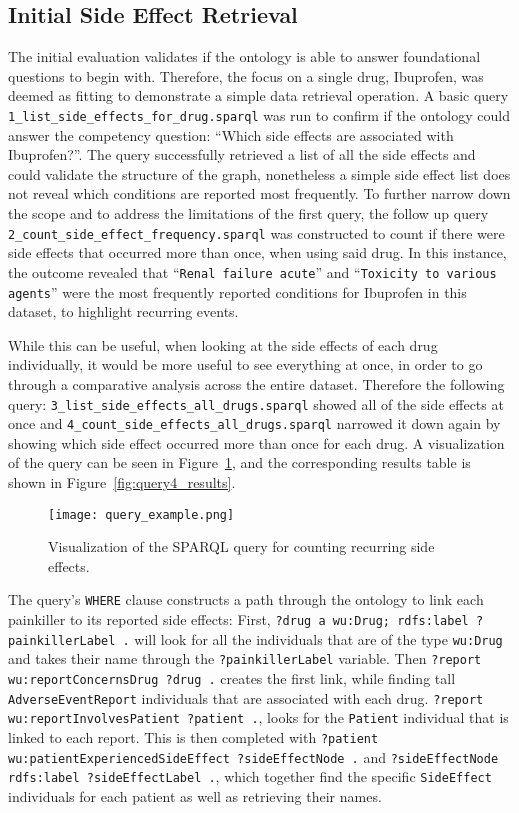 \subsection{Initial Side Effect Retrieval}
The initial evaluation validates if the ontology is able to answer foundational questions to begin with. Therefore, the focus on a single drug, Ibuprofen, was deemed as fitting to demonstrate a simple data retrieval operation.
A basic query \nolinkurl{1_list_side_effects_for_drug.sparql} was run to confirm if the ontology could answer the competency question: “Which side effects are associated with Ibuprofen?”. The query successfully retrieved a list of all the side effects and could validate the structure of the graph, nonetheless a simple side effect list does not reveal which conditions are reported most frequently. To further narrow down the scope and to address the limitations of the first query, the follow up query \nolinkurl{2_count_side_effect_frequency.sparql} was constructed to count if there were side effects that occurred more than once, when using said drug. In this instance, the outcome revealed that ``\texttt{Renal failure acute}'' and ``\texttt{Toxicity to various agents}'' were the most frequently reported conditions for Ibuprofen in this dataset, to highlight recurring events.

While this can be useful, when looking at the side effects of each drug individually, it would be more useful to see everything at once, in order to go through a comparative analysis across the entire dataset. Therefore the following query: \nolinkurl{3_list_side_effects_all_drugs.sparql} showed all of the side effects at once and \nolinkurl{4_count_side_effects_all_drugs.sparql} narrowed it down again by showing which side effect occurred more than once for each drug. A visualization of the query can be seen in Figure~\ref{fig:query4_visualization}, and the corresponding results table is shown in Figure~\ref{fig:query4_results}.

\begin{figure}[H]
\centering
\texttt{[image: query\_example.png]} %
\caption{Visualization of the SPARQL query for counting recurring side effects.}
\label{fig:query4_visualization}
\end{figure}


The query’s \texttt{WHERE} clause constructs a path through the ontology to link each painkiller to its reported side effects:
First, \nolinkurl{?drug a wu:Drug; rdfs:label ?painkillerLabel .} will look for all the individuals that are of the type \texttt{wu:Drug} and takes their name through the \texttt{?painkillerLabel} variable.
Then \nolinkurl{?report wu:reportConcernsDrug ?drug .} creates the first link, while finding tall \texttt{Adverse\-Event\-Report} individuals that are associated with each drug. \nolinkurl{?report wu:reportInvolvesPatient ?patient .}, looks for the \texttt{Patient} individual that is linked to each report. This is then completed with \nolinkurl{?patient wu:patientExperiencedSideEffect ?sideEffectNode .} and \nolinkurl{?sideEffectNode rdfs:label ?sideEffectLabel .}, which together find the specific \texttt{Side\-Effect} individuals for each patient as well as retrieving their names.


